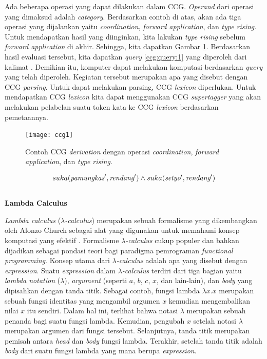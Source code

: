 Ada beberapa operasi yang dapat dilakukan dalam CCG. \textit{Operand} dari operasi
yang dimaksud adalah \textit{category}. Berdasarkan contoh di atas, akan ada tiga
operasi yang dijalankan yaitu \textit{coordination}, \textit{forward application},
dan \textit{type rising}.
Untuk mendapatkan hasil yang diinginkan, kita lakukan \textit{type rising} sebelum
\textit{forward application} di akhir.
Sehingga, kita dapatkan Gambar \ref{ccg-fig1}.
Berdasarkan hasil evaluasi tersebut, kita dapatkan \textit{query} \ref{ccg:query:1}
yang diperoleh dari kalimat .
Demikian itu, komputer dapat melakukan komputasi berdasarkan \textit{query} yang telah diperoleh.
Kegiatan tersebut merupakan apa yang disebut dengan CCG \textit{parsing}.
Untuk dapat melakukan parsing, CCG \textit{lexicon} diperlukan.
Untuk mendapatkan CCG \textit{lexicon} kita dapat menggunakan CCG \textit{supertagger}
yang akan melakukan pelabelan suatu token kata ke CCG \textit{lexicon} berdasarkan
pemetaannya.

\begin{figure}\centering\small
  \texttt{[image: ccg1]}
  \caption{
    Contoh CCG \textit{derivation} dengan operasi \textit{coordination},
    \textit{forward application}, dan \textit{type rising}.}
  \label{ccg-fig1}
\end{figure}

\begin{equation}\label{ccg:query:1}
  suka(\mbox{\it pamungkas}^\prime, \mbox{\it rendang}^\prime) \land suka(\mbox{\it setyo}^\prime, \mbox{\it rendang}^\prime)
\end{equation}
\\


\noindent\textbf{Lambda Calculus}

\textit{Lambda calculus} ({$\lambda$}\textit{-calculus}) merupakan sebuah formalisme yang dikembangkan
oleh Alonzo Church sebagai alat yang digunakan untuk memahami konsep komputasi yang efektif
\citep{DBLP:journals/corr/Rojas15}.
Formalisme {$\lambda$}\textit{-calculus} cukup populer dan bahkan dijadikan sebagai pondasi teori bagi
paradigma pemrograman \textit{functional programming}.
Konsep utama dari {$\lambda$}\textit{-calculus} adalah apa yang disebut dengan \textit{expression}.
Suatu \textit{expression} dalam {$\lambda$}\textit{-calculus} terdiri dari tiga bagian yaitu
\textit{lambda notation} ({$\lambda$}), \textit{argument} (seperti $a$, $b$, $c$, $x$, dan lain-lain),
dan \textit{body} yang dipisahkan dengan tanda titik.
Sebagai contoh, fungsi lambda ${\lambda}x. x$ merupakan sebuah fungsi identitas yang mengambil
argumen $x$ kemudian mengembalikan nilai $x$ itu sendiri.
Dalam hal ini, terlihat bahwa notasi {$\lambda$} merupakan sebuah penanda bagi suatu fungsi lambda.
Kemudian, pengubah $x$ setelah notasi {$\lambda$} merupakan argumen dari fungsi tersebut.
Selanjutnya, tanda titik merupakan pemisah antara \textit{head} dan \textit{body} fungsi lambda.
Terakhir, setelah tanda titik adalah \textit{body} dari suatu fungsi lambda yang mana berupa
\textit{expression}.


